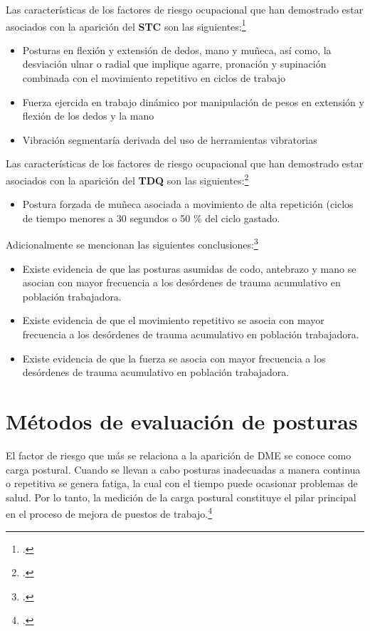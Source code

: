 Las características de los factores de riesgo ocupacional que han demostrado estar asociados con la aparición del \textbf{STC} son las siguientes:\footcite[45]{MinisteriodeProteccionSocialdeColombia2006GuiaSuperiores}
\begin{itemize}
\item Posturas en flexión y extensión de dedos, mano y muñeca, así como, la desviación ulnar o radial que implique agarre, pronación y supinación combinada con el movimiento repetitivo en ciclos de trabajo
\item Fuerza ejercida en trabajo dinámico por manipulación de pesos en extensión y flexión de los dedos y la mano
\item Vibración segmentaría derivada del uso de herramientas vibratorias
\end{itemize}
Las características de los factores de riesgo ocupacional que han demostrado estar asociados con la aparición del \textbf{TDQ} son las siguientes:\footcite[45]{MinisteriodeProteccionSocialdeColombia2006GuiaSuperiores}
\begin{itemize}
\item Postura forzada de muñeca asociada a movimiento de alta repetición (ciclos de tiempo menores a 30 segundos o 50 \% del ciclo gastado.
\end{itemize}
Adicionalmente se mencionan las siguientes conclusiones:\footcite[46]{MinisteriodeProteccionSocialdeColombia2006GuiaSuperiores}
\begin{itemize}
\item Existe evidencia de que las posturas asumidas de codo, antebrazo y mano se asocian con mayor frecuencia a los desórdenes de trauma acumulativo en población trabajadora.
\item Existe evidencia de que el movimiento repetitivo se asocia con mayor frecuencia a los desórdenes de trauma acumulativo en población trabajadora.
\item Existe evidencia de que la fuerza se asocia con mayor frecuencia a los desórdenes de trauma acumulativo en población trabajadora.
\end{itemize}



\section{Métodos de evaluación de posturas}
El factor de riesgo que más se relaciona a la aparición de DME se conoce como carga postural. Cuando se llevan a cabo posturas inadecuadas a manera continua o repetitiva se genera fatiga, la cual con el tiempo puede ocasionar problemas de salud. Por lo tanto, la medición de la carga postural constituye el pilar principal en el proceso de mejora de puestos de trabajo.\footcite[144]{RamosEdgarShrawan2004WorkingReview}
